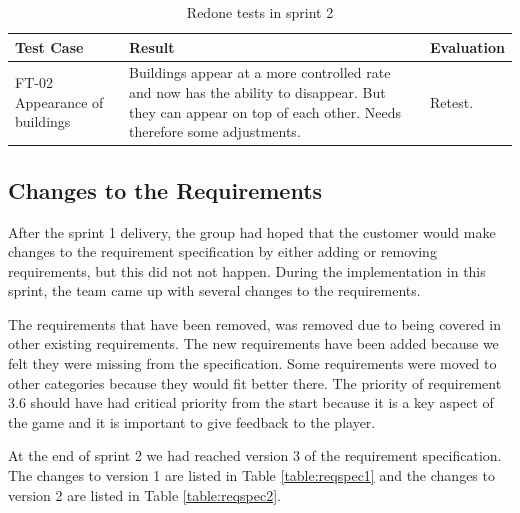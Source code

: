 	\begin{table}[H]
	\begin{tabular}{| p{3cm} | p{6.5cm} | p{2.5cm} |}
		\hline
		\rowcolor{lightgray}
		{\bf Test Case} & {\bf Result} & {\bf Evaluation} \\ \hline

		FT-02 Appearance of buildings & Buildings appear at a more controlled rate and now has the ability to disappear. But they can appear on top of each other. Needs therefore some adjustments. & Retest. \\ \hline

	\end{tabular}
	\caption{Redone tests in sprint 2}
	\label{table:retestssprint2}
	\end{table}

\subsection{Changes to the Requirements}
	
	After the sprint 1 delivery, the group had hoped that the customer would make 
	changes to the requirement specification by either adding or removing requirements, 
	but this did not not happen. During the implementation in this sprint, the 
	team came up with several changes to the requirements.

	The requirements that have been removed, was removed due to being covered in other 
	existing requirements. The new requirements have been added because we felt they were 
	missing from the specification. Some requirements were moved to other categories because 
	they would fit better there. The priority of requirement 3.6 should have had critical priority 
	from the start because it is a key aspect of the game and it is important to give feedback to the player.

	At the end of sprint 2 we had reached version 3 of the requirement specification. The changes to version 1 are listed in Table \ref{table:reqspec1} and the changes to version 2 are listed in Table \ref{table:reqspec2}.

